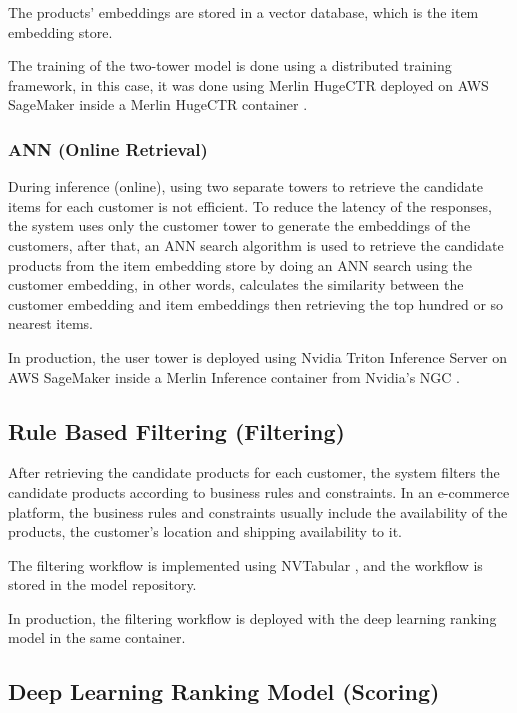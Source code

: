 The products' embeddings are stored in a vector database, which is the item embedding store.

The training of the two-tower model is done using a distributed training framework, in this case,
 it was done using Merlin HugeCTR \cite{NvidiaHugeCTR} deployed on AWS SageMaker \cite{AwsSageMaker} inside a Merlin HugeCTR container \cite{HugeCTRContainer}.

\subsubsection{ANN (Online Retrieval)}

During inference (online), using two separate towers to retrieve the candidate items for each customer is not efficient. \cite{NvidiaFeatureStores}
To reduce the latency of the responses, the system uses only the customer tower to generate the embeddings of the customers,
after that, an ANN search algorithm is used to retrieve the candidate products from the item embedding store by doing an ANN search using the customer embedding, 
in other words, calculates the similarity between the customer embedding and item embeddings then retrieving the top hundred or so nearest items.

In production, the user tower is deployed using Nvidia Triton Inference Server \cite{Triton} on 
AWS SageMaker \cite{AwsSageMaker} inside a Merlin Inference container \cite{NvidiaMerlinInference} from Nvidia's NGC \cite{NvidiaNGC}.

\subsection{Rule Based Filtering (Filtering)}

After retrieving the candidate products for each customer, the system filters the candidate products according to business rules and constraints.
In an e-commerce platform, the business rules and constraints usually include the availability of the products, the customer's location and shipping availability to it.


The filtering workflow is implemented using NVTabular \cite{MerlinNVTabular}, and the workflow is stored in the model repository.

In production, the filtering workflow is deployed with the deep learning ranking model in the same container.

\subsection{Deep Learning Ranking Model (Scoring)}


